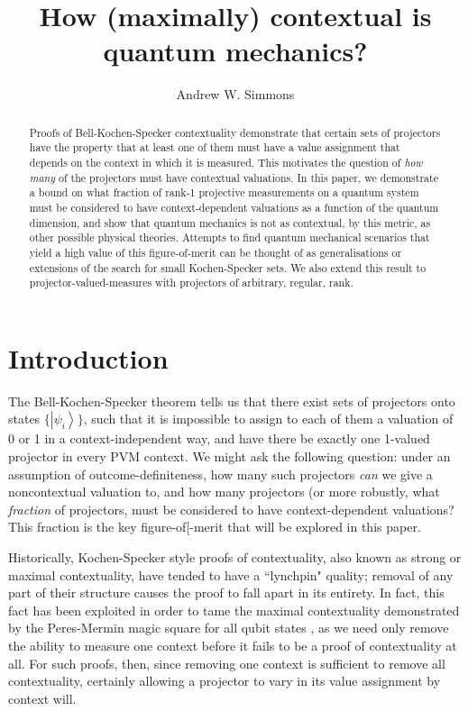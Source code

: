 \documentclass{amsart}
\theoremstyle{definition}
\newcommand{\ket}[1]{{\left\vert{#1}\right\rangle}}
\begin{document}
\title{How (maximally) contextual is quantum mechanics?}
\author{Andrew W. Simmons}
\address{Department of Physics, Imperial College London, SW7 2AZ.}
\begin{abstract}
Proofs of Bell-Kochen-Specker contextuality demonstrate that certain sets of projectors have the property that at least one of them must have a value assignment that depends on the context in which it is measured. This motivates the question of \emph{how many} of the projectors must have contextual valuations. In this paper, we demonstrate a bound on what fraction of rank-1 projective measurements on a quantum system must be considered to have context-dependent valuations as a function of the quantum dimension, and show that quantum mechanics is not as contextual, by this metric, as other possible physical theories. Attempts to find quantum mechanical scenarios that yield a high value of this figure-of-merit can be thought of as generalisations or extensions of the search for small Kochen-Specker sets. We also extend this result to projector-valued-measures with projectors of arbitrary, regular, rank.
\end{abstract}
\maketitle
\section{Introduction}

The Bell-Kochen-Specker theorem tells us that there exist sets of projectors onto states $\{\ket{\psi_i}\}$, such that it is impossible to assign to each of them a valuation of 0 or 1 in a context-independent way, and have there be exactly one 1-valued projector in every PVM context. We might ask the following question: under an assumption of outcome-definiteness, how many such projectors \emph{can} we give a noncontextual valuation to, and how many projectors (or more robustly, what \emph{fraction} of projectors, must be considered to have context-dependent valuations? This fraction is the key figure-of[-merit that will be explored in this paper.

Historically, Kochen-Specker style proofs of contextuality, also known as strong or maximal contextuality, have tended to have a ``lynchpin" quality; removal of any part of their structure causes the proof to fall apart in its entirety. In fact, this fact has been exploited in order to tame the maximal contextuality demonstrated by the Peres-Mermin magic square for all qubit states \cite{Berm2016}, as we need only remove the ability to measure one context before it fails to be a proof of contextuality at all. For such proofs, then, since removing one context is sufficient to remove all contextuality, certainly allowing a projector to vary in its value assignment by context will.
\end{document}
